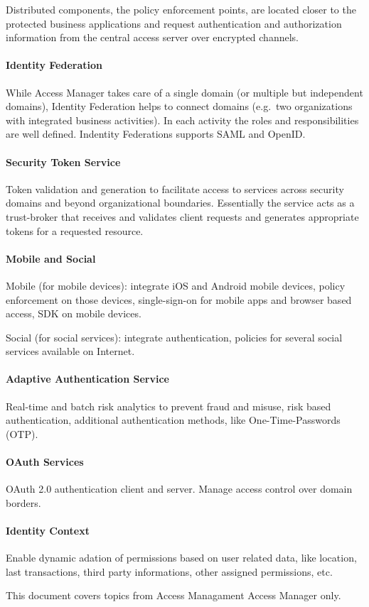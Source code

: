 Distributed components, the policy enforcement points, are located
closer to the protected business applications and request authentication
and authorization information from the central access server over
encrypted channels.


\paragraph{Identity Federation}

While Access Manager takes care of a single domain (or multiple but
independent domains), Identity Federation helps to connect domains
(e.g.\ two organizations with integrated business activities).  In each
activity the roles and responsibilities are well defined. Indentity
Federations supports SAML and OpenID\@.

\paragraph{Security Token Service}

Token validation and generation to facilitate access to services across
security domains and beyond organizational boundaries. Essentially the
service acts as a trust-broker that receives and validates client
requests and generates appropriate tokens for a requested resource.

\paragraph{Mobile and Social}

Mobile (for mobile devices): integrate iOS and Android mobile devices,
policy enforcement on those devices, single-sign-on for mobile apps and
browser based access, SDK on mobile devices.

Social (for social services): integrate authentication, policies for
several social services available on Internet.


\paragraph{Adaptive Authentication Service}

Real-time and batch risk analytics to prevent fraud and misuse, risk
based authentication, additional authentication methods, like
One-Time-Passwords (OTP).


\paragraph{OAuth Services}

OAuth 2.0 authentication client and server. Manage access control over
domain borders.


\paragraph{Identity Context}

Enable dynamic adation of permissions based on user related data, like
location, last transactions, third party informations, other assigned
permissions, etc.


This document covers topics from Access Managament Access Manager only.


